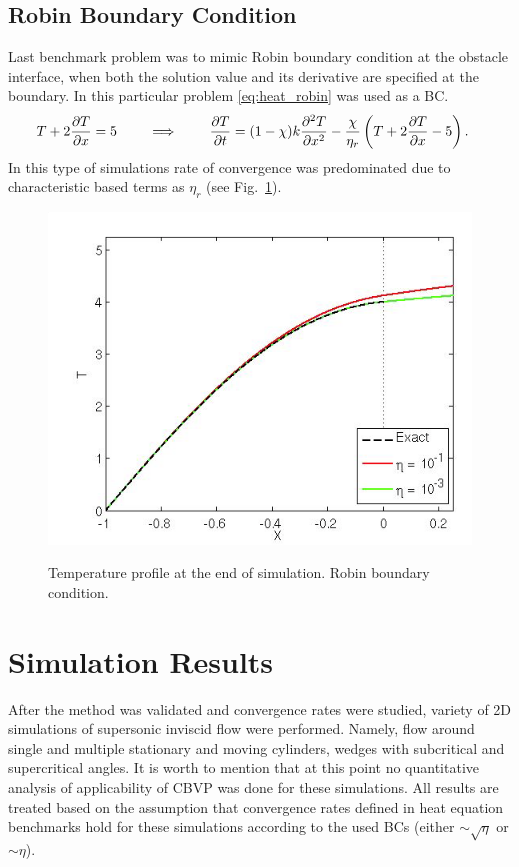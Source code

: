 \subsection{Robin Boundary Condition}
Last benchmark problem was to mimic Robin boundary condition at the obstacle interface, when both the solution value and its derivative are specified at the boundary. In this particular problem \eqref{eq:heat_robin} was used as a BC.
\begin{align}
T + 2 \frac {\partial T}{\partial x} = 5 \qquad \implies \qquad \frac {\partial T}{\partial t} &= (1-\chi)k \frac {\partial^2 T}{\partial x^2} - \frac \chi {\eta_r} \left(T + 2 \frac {\partial T}{\partial x} - 5\right). \label{eq:heat_robin}
\end{align}
In this type of simulations rate of convergence was predominated due to characteristic based terms as $\eta_r$ \cite{ebd_nk_ovv_cbvp_jcp} (see Fig.~\ref{fig:heat_robin}).
\begin{figure}[h!]
\centering \includegraphics[scale=0.6]{fig/heat_robin.png}\\
\caption{Temperature profile at the end of simulation. Robin boundary condition. \label{fig:heat_robin}}
\end{figure} 

\section{Simulation Results}
After the method was validated and convergence rates were studied, variety of 2D simulations of supersonic inviscid flow were performed. Namely, flow around single and multiple stationary and moving cylinders, wedges with subcritical and supercritical angles. It is worth to mention that at this point no quantitative analysis of applicability of CBVP was done for these simulations. All results are treated based on the assumption that convergence rates defined in heat equation benchmarks hold for these simulations according to the used BCs (either $\sim \sqrt \eta$ or $\sim \eta$). 

{\color{red}{All of our results here, for cylinders, wedge, etc, split by subsections}}






